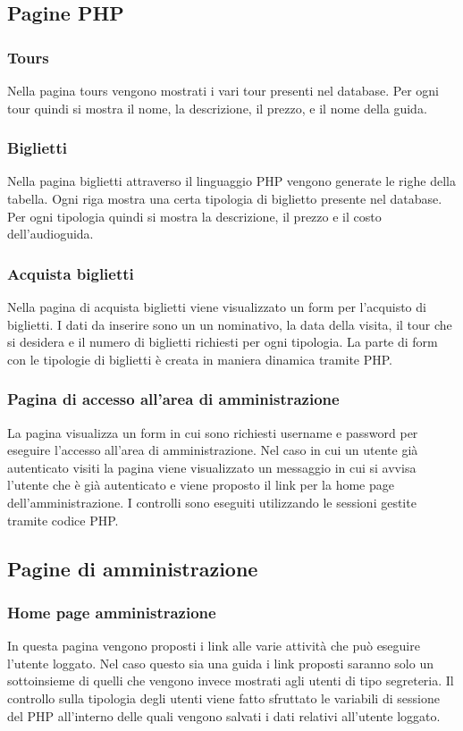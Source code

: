 \documentclass[10pt,a4paper,onecolumn]{article}
\begin{document}
\subsection{Pagine PHP}
\subsubsection{Tours}
Nella pagina tours vengono mostrati i vari tour presenti nel database. Per ogni tour quindi si mostra il nome, la descrizione, il prezzo, e il nome della guida.

\subsubsection{Biglietti}
Nella pagina biglietti attraverso il linguaggio PHP vengono generate le righe della tabella. Ogni riga mostra una certa tipologia di biglietto presente nel database. Per ogni tipologia quindi si mostra la descrizione, il prezzo e il costo dell'audioguida.

\subsubsection{Acquista biglietti}
Nella pagina di acquista biglietti viene visualizzato un form per l'acquisto di biglietti. I dati da inserire sono un un nominativo, la data della visita, il tour che si desidera e il numero di biglietti richiesti per ogni tipologia. La parte di form con le tipologie di biglietti è creata in maniera dinamica tramite PHP.

\subsubsection{Pagina di accesso all'area di amministrazione}
La pagina visualizza un form in cui sono richiesti username e password per eseguire l'accesso all'area di amministrazione. Nel caso in cui un utente già autenticato visiti la pagina viene visualizzato un messaggio in cui si avvisa l'utente che è già autenticato e viene proposto il link per la home page dell'amministrazione. I controlli sono eseguiti utilizzando le sessioni gestite tramite codice PHP.

\subsection{Pagine di amministrazione}
\subsubsection{Home page amministrazione}
In questa pagina vengono proposti i link alle varie attività che può eseguire l'utente loggato. Nel caso questo sia una guida i link proposti saranno solo un sottoinsieme di quelli che vengono invece mostrati agli utenti di tipo segreteria. Il controllo sulla tipologia degli utenti viene fatto sfruttato le variabili di sessione del PHP all'interno delle quali vengono salvati i dati relativi all'utente loggato.
\end{document}
